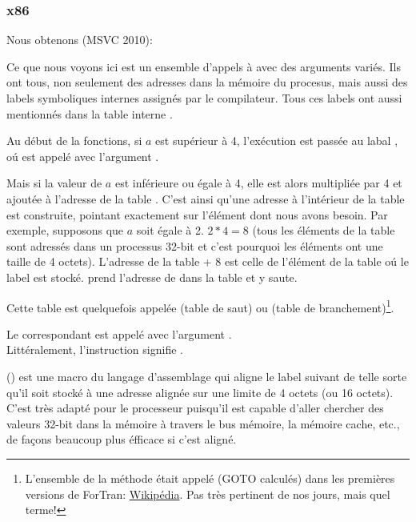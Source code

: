 \subsubsection{x86}


Nous obtenons (MSVC 2010):




Ce que nous voyons ici est un ensemble d'appels à \printf avec des arguments variés.
Ils ont tous, non seulement des adresses dans la mémoire du procesus, mais aussi
des labels symboliques internes assignés par le compilateur.
Tous ces labels ont aussi mentionnés dans la table interne .

Au début de la fonctions, si $a$ est supérieur à 4, l'exécution est passée au
labal , oú \printf est appelé avec l'argument .

Mais si la valeur de $a$ est inférieure ou égale à 4, elle est alors multipliée
par 4 et ajoutée à l'adresse de la table . C'est ainsi qu'une adresse
à l'intérieur de la table est construite, pointant exactement sur l'élément dont
nous avons besoin. Par exemple, supposons que $a$ soit égale à 2. $2*4 = 8$ (tous
les éléments de la table sont adressés dans un processus 32-bit et c'est pourquoi
les éléments ont une taille de 4 octets).
L'adresse de la table  + 8 est celle de l'élément de la table oú
le label  est stocké.
\JMP prend l'adresse de  dans la table et y saute.

Cette table est quelquefois appelée  (table de saut) ou 
(table de branchement)\footnote{L'ensemble de la méthode était appelé  (GOTO calculés) dans les premières versions de ForTran:
\href{http://go.yurichev.com/17122}{Wikipédia}.
Pas très pertinent de nos jours, mais quel terme!}.

Le \printf correspondant est appelé avec l'argument .\\
Littéralement, l'instruction  signifie
 .

 () est une macro du langage d'assemblage qui aligne le
label suivant de telle sorte qu'il soit stocké à une adresse alignée sur une limite
de 4 octets (ou 16 octets).
C'est très adapté pour le processeur puisqu'il est capable d'aller chercher des
valeurs 32-bit dans la mémoire à travers le bus mémoire, la mémoire cache, etc.,
de façons beaucoup plus éfficace si c'est aligné.

